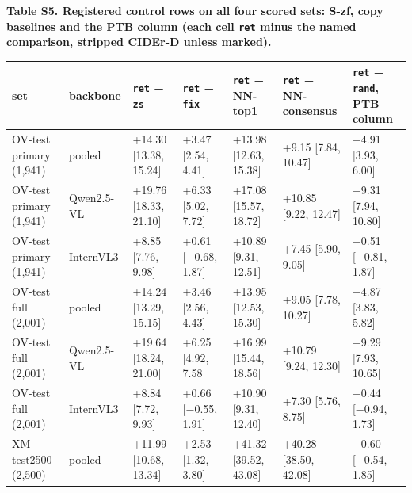\textbf{Table S5. Registered control rows on all four scored sets: S-zf, copy baselines and the PTB
column (each cell \texttt{ret} minus the named comparison, stripped CIDEr-D unless marked).}

\begin{longtable}[]{@{}
  >{\raggedright\arraybackslash}p{}
  >{\raggedright\arraybackslash}p{}
  >{\raggedright\arraybackslash}p{}
  >{\raggedright\arraybackslash}p{}
  >{\raggedright\arraybackslash}p{}
  >{\raggedright\arraybackslash}p{}
  >{\raggedright\arraybackslash}p{}@{}}
\toprule\noalign{}
set & backbone & \texttt{ret} − \texttt{zs} & \texttt{ret} − \texttt{fix} & \texttt{ret} − NN-top1 & \texttt{ret} − NN-consensus & \texttt{ret} − \texttt{rand}, PTB column \\
\midrule\noalign{}
\endhead
\bottomrule\noalign{}
\endlastfoot
OV-test primary (1,941) & pooled & +14.30 {[}13.38, 15.24{]} & +3.47 {[}2.54, 4.41{]} & +13.98
{[}12.63, 15.38{]} & +9.15 {[}7.84, 10.47{]} & +4.91 {[}3.93, 6.00{]} \\
OV-test primary (1,941) & Qwen2.5-VL & +19.76 {[}18.33, 21.10{]} & +6.33 {[}5.02, 7.72{]} & +17.08
{[}15.57, 18.72{]} & +10.85 {[}9.22, 12.47{]} & +9.31 {[}7.94, 10.80{]} \\
OV-test primary (1,941) & InternVL3 & +8.85 {[}7.76, 9.98{]} & +0.61 {[}−0.68, 1.87{]} & +10.89
{[}9.31, 12.51{]} & +7.45 {[}5.90, 9.05{]} & +0.51 {[}−0.81, 1.87{]} \\
OV-test full (2,001) & pooled & +14.24 {[}13.29, 15.15{]} & +3.46 {[}2.56, 4.43{]} & +13.95
{[}12.53, 15.30{]} & +9.05 {[}7.78, 10.27{]} & +4.87 {[}3.83, 5.82{]} \\
OV-test full (2,001) & Qwen2.5-VL & +19.64 {[}18.24, 21.00{]} & +6.25 {[}4.92, 7.58{]} & +16.99
{[}15.44, 18.56{]} & +10.79 {[}9.24, 12.30{]} & +9.29 {[}7.93, 10.65{]} \\
OV-test full (2,001) & InternVL3 & +8.84 {[}7.72, 9.93{]} & +0.66 {[}−0.55, 1.91{]} & +10.90
{[}9.31, 12.40{]} & +7.30 {[}5.76, 8.75{]} & +0.44 {[}−0.94, 1.73{]} \\
XM-test2500 (2,500) & pooled & +11.99 {[}10.68, 13.34{]} & +2.53 {[}1.32, 3.80{]} & +41.32 {[}39.52,
43.08{]} & +40.28 {[}38.50, 42.08{]} & +0.60 {[}−0.54, 1.85{]} \\

\end{longtable}
